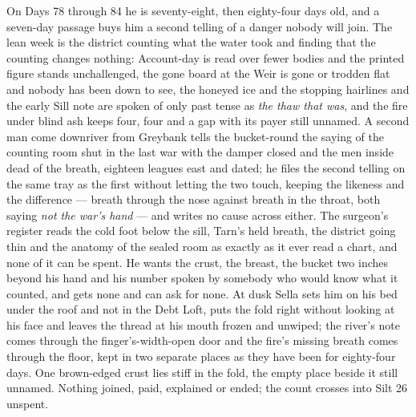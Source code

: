 \documentclass{design/chronicle}
\begin{document}
{On Days 78 through 84 he is seventy-eight, then eighty-four days old, and a seven-day passage buys him a second telling of a danger nobody will join. The lean week is the district counting what the water took and finding that the counting changes nothing: Account-day is read over fewer bodies and the printed figure stands unchallenged, the gone board at the Weir is gone or trodden flat and nobody has been down to see, the honeyed ice and the stopping hairlines and the early Sill note are spoken of only past tense as \emph{the thaw that was}, and the fire under blind ash keeps four, four and a gap with its payer still unnamed. A second man come downriver from Greybank tells the bucket-round the saying of the counting room shut in the last war with the damper closed and the men inside dead of the breath, eighteen leagues east and dated; he files the second telling on the same tray as the first without letting the two touch, keeping the likeness and the difference — breath through the nose against breath in the throat, both saying \emph{not the war’s hand} — and writes no cause across either. The surgeon’s register reads the cold foot below the sill, Tarn’s held breath, the district going thin and the anatomy of the sealed room as exactly as it ever read a chart, and none of it can be spent. He wants the crust, the breast, the bucket two inches beyond his hand and his number spoken by somebody who would know what it counted, and gets none and can ask for none. At dusk Sella sets him on his bed under the roof and not in the Debt Loft, puts the fold right without looking at his face and leaves the thread at his mouth frozen and unwiped; the river’s note comes through the finger’s-width-open door and the fire’s missing breath comes through the floor, kept in two separate places as they have been for eighty-four days. One brown-edged crust lies stiff in the fold, the empty place beside it still unnamed. Nothing joined, paid, explained or ended; the count crosses into Silt 26 unspent.

}
\end{document}
